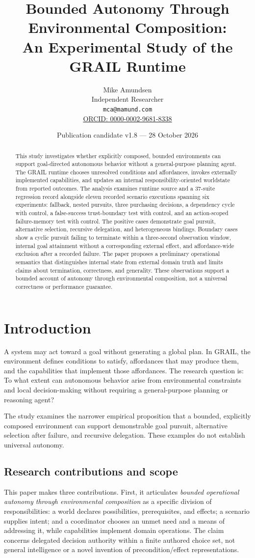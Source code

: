 \documentclass[11pt]{article}
\title{Bounded Autonomy Through Environmental Composition:\\An Experimental Study of the GRAIL Runtime}
\author{Mike Amundsen\\Independent Researcher\\\texttt{mca@mamund.com}\\\href{https://orcid.org/0000-0002-9681-8338}{ORCID: 0000-0002-9681-8338}}
\date{Publication candidate v1.8 --- 28 October 2026}
\begin{document}
\maketitle
\begin{abstract}
This study investigates whether explicitly composed, bounded environments can support goal-directed autonomous behavior without a general-purpose planning agent. The GRAIL runtime chooses unresolved conditions and affordances, invokes externally implemented capabilities, and updates an internal responsibility-oriented worldstate from reported outcomes. The analysis examines runtime source and a 37-suite regression record alongside eleven recorded scenario executions spanning six experiments: fallback, nested pursuits, three purchasing decisions, a dependency cycle with control, a false-success trust-boundary test with control, and an action-scoped failure-memory test with control. The positive cases demonstrate goal pursuit, alternative selection, recursive delegation, and heterogeneous bindings. Boundary cases show a cyclic pursuit failing to terminate within a three-second observation window, internal goal attainment without a corresponding external effect, and affordance-wide exclusion after a recorded failure. The paper proposes a preliminary operational semantics that distinguishes internal state from external domain truth and limits claims about termination, correctness, and generality. These observations support a bounded account of autonomy through environmental composition, not a universal correctness or performance guarantee.
\end{abstract}
\section{Introduction}
A system may act toward a goal without generating a global plan. In GRAIL, the environment defines conditions to satisfy, affordances that may produce them, and the capabilities that implement those affordances. The research question is: To what extent can autonomous behavior arise from environmental constraints and local decision-making without requiring a general-purpose planning or reasoning agent?

The study examines the narrower empirical proposition that a bounded, explicitly composed environment can support demonstrable goal pursuit, alternative selection after failure, and recursive delegation. These examples do not establish universal autonomy.

\subsection{Research contributions and scope}
This paper makes three contributions. First, it articulates \emph{bounded operational autonomy through environmental composition} as a specific division of responsibilities: a world declares possibilities, prerequisites, and effects; a scenario supplies intent; and a coordinator chooses an unmet need and a means of addressing it, while capabilities implement domain operations. The claim concerns delegated decision authority within a finite authored choice set, not general intelligence or a novel invention of precondition/effect representations.
\end{document}
